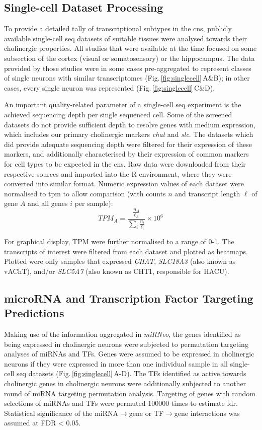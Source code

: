 \begin{method}
\subsection{Single-cell Dataset Processing}

To provide a detailed tally of transcriptional subtypes in the \ac{cns}, publicly available single-cell \ac{seq} datasets of suitable tissues were analysed towards their cholinergic properties. All studies that were available at the time focused on some subsection of the cortex (visual or somatosensory) or the hippocampus. The data provided by those studies were in some cases pre-aggregated to represent classes of single neurons with similar transcriptomes (Fig.\,\ref{fig:singlecell}\,A\&B\cite{Zeisel2015, Tasic2016}); in other cases, every single neuron was represented (Fig.\,\ref{fig:singlecell}\,C\&D\cite{Darmanis2015, Habib2016}). 

An important quality-related parameter of a single-cell \ac{seq} experiment is the achieved sequencing depth per single sequenced cell. Some of the screened datasets do not provide sufficient depth to resolve genes with medium expression, which includes our primary cholinergic markers \textit{\ac{chat}} and \textit{\ac{slc}}. The datasets which did provide adequate sequencing depth were filtered for their expression of these markers, and additionally characterised by their expression of common markers for cell types to be expected in the \ac{cns}. Raw data were downloaded from their respective sources and imported into the R environment, where they were converted into similar format. Numeric expression values of each dataset were normalised to \ac{tpm} to allow comparison (with counts $n$ and transcript length $\ell$ of gene $A$ and all genes $i$ per sample): $$TPM_A = \frac{\frac{n_A}{\ell_A}}{\sum_i \frac{n_i}{\ell_i}}\times 10^6$$

For graphical display, TPM were further normalised to a range of \num{0}-\num{1}. The transcripts of interest were filtered from each dataset and plotted as heatmaps. Plotted were only samples that expressed \emph{CHAT}, \emph{SLC18A3} (also known as vAChT), and/or \emph{SLC5A7} (also known as CHT1, responsible for HACU).

\subsection{microRNA and Transcription Factor Targeting Predictions}
Making use of the information aggregated in \emph{miRNeo}, the genes identified as being expressed in cholinergic neurons were subjected to permutation targeting analyses of miRNAs and TFs. Genes were assumed to be expressed in cholinergic neurons if they were expressed in more than one individual sample in all single-cell \ac{seq} datasets (Fig.\,\ref{fig:singlecell}\,A-D). The TFs identified as active towards cholinergic genes in cholinergic neurons were additionally subjected to another round of miRNA targeting permutation analysis. Targeting of genes with random selections of miRNAs and TFs were permuted \num{100000} times to estimate \ac{fdr}. Statistical significance of the miRNA$\to$gene or TF$\to$gene interactions was assumed at FDR < 0.05.


\end{method}
